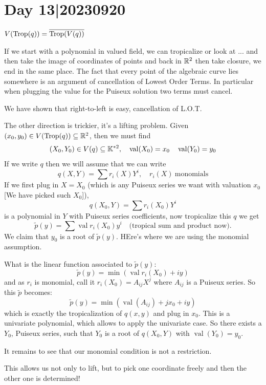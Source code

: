 \documentclass[12pt]{memoir}
\DeclareMathOperator{\val}{val}
\DeclareMathOperator{\Trop}{Trop}
\begin{document}
\section{Day 13|20230920}

\begin{Th}
$V(\Trop(q))=\ov{\Trop(V(q))}$
\end{Th}

If we start with a polynomial in valued field, we can tropicalize or look at ... and then take the image of coordinates of points and back in $\mathbb{R}^2$ then take closure, we end in the same place. The fact that every point of the algebraic curve  lies somewhere is an argument of cancellation of Lowest Order Terms. In particular when plugging the value for the Puiseux solution two terms must cancel. 
\begin{ptcbp}
We have shown that right-to-left is easy, cancellation of L.O.T.\par 
The other direction is trickier, it's a lifting problem. Given $(x_0,y_0)\in V(\Trop(q))\subseteq\bR^2$, then we must find 
$$(X_0,Y_0)\in V(q)\subseteq \bK^{\ast2},\quad\val(X_0)=x_0\quad\val(Y_0)=y_0$$
If we write $q$ then we will assume that we can write 
$$q(X,Y)=\sum r_i(X)Y^i,\quad r_i(X)\ \text{monomials}$$
If we first plug in $X=X_0$ (which is any Puiseux series we want with valuation $x_0$ [We have picked such $X_0$]), 
$$q(X_0,Y)=\sum r_i(X_0)Y^i$$
is a polynomial in $Y$ with Puiseux series coefficients, now tropicalize this $q$ we get 
$$\tilde{p}(y)=\sum\val r_i(X_0)y^i\quad\text{(tropical sum and product now)}.$$
We claim that $y_0$ is a root of $\tilde{p}(y)$. HEre's where we are using the monomial assumption.\par 
What is the linear function associated to $\tilde{p}(y)$:
$$\tilde{p}(y)=\min(\val r_i(X_0)+iy)$$
and as $r_i$ is monomial, call it $r_i(X_0)=A_{ij}X^j$ where $A_{ij}$ is a Puiseux series. So this $\tilde{p}$ becomes:
$$\tilde{p}(y)=\min(\val(A_{ij})+jx_0+iy)$$
which is exactly the tropicalization of $q(x,y)$ and plug in $x_0$. This is a univariate polynomial, which allows to apply the univariate case. So there exists a $Y_0$, Puiseux series, such that $Y_0$ is a root of $q(X_0,Y)$ with $\val(Y_0)=y_0$.\par 
It remains to see that our monomial condition is not a restriction. 
\end{ptcbp}

This allows us not only to lift, but to pick one coordinate freely and then the other one is determined!
\end{document}
